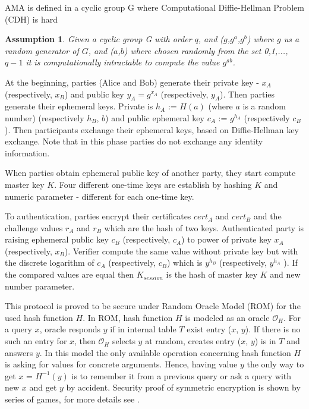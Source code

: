 \documentclass[11pt,titlepage]{article}
\theoremstyle{plain}
\newtheorem{assumption}{Assumption}
\begin{document}
AMA is defined in a cyclic group G where Computational Diffie-Hellman Problem (CDH) is hard

\begin{assumption}
Given a cyclic group G with order $q$, and ($g$,$g^a$,$g^b$) where $g$ us a random generator of $G$, and ($a$,$b$) where chosen randomly from the set {0,1,...,$q-1$} it is computationally intractable to compute the value $g^{ab}$.
\end{assumption}

At the beginning, parties (Alice and Bob) generate their private key - $x_A$ (respectively, $x_B$) and public key $y_A = g^{x_A}$ (respectively, $y_A$). Then parties generate their ephemeral keys. Private is $h_A$ := $H(a)$ (where $a$ is a random number) (respectively $h_B$, $b$) and public ephemeral key $c_A$ := $g^{h_A}$ (respectively $c_B$). Then participants exchange their ephemeral keys, based on Diffie-Hellman key exchange. Note that in this phase parties do not exchange any identity information.

\vspace{5mm}

When parties obtain ephemeral public key of another party, they start compute master
key $K$. Four different one-time keys are establish by hashing $K$ and numeric parameter - different for each one-time key.

\vspace{5mm}

To authentication, parties encrypt their certificates $cert_A$ and $cert_B$ and the challenge values $r_A$ and $r_B$ which are the hash of two keys. Authenticated party is raising ephemeral public key $c_B$ (respectively, $c_A$) to power of private key $x_A$ (respectively, $x_B$). Verifier compute the same value without private key but with the discrete logarithm of $c_A$ (respectively, $c_B$) which is $y^{h_B}$ (respectively, $y^{h_A}$ ). If the compared values are equal then $K_{session}$ is the hash of master key $K$ and new number parameter.

\vspace{5mm}

This protocol is proved to be secure under Random Oracle Model (ROM) for the used
hash function $H$. In ROM, hash function $H$ is modeled as an oracle $\mathcal{O}_H$. For a query $x$, oracle responds $y$ if in internal table $T$ exist entry ($x$, $y$). If there is no such an entry for $x$, then $\mathcal{O}_H$ selects $y$ at random, creates entry ($x$, $y$) is in $T$ and answers $y$. In this model the only available operation concerning hash function $H$ is asking for values for concrete arguments. Hence, having value $y$ the only way to get $x$ = $H^{-1}(y)$ is to remember it from a previous query or ask a query with new $x$ and get $y$ by accident. Security proof of symmetric encryption is shown by series of games, for more details see \cite{AMA}. 
\end{document}
